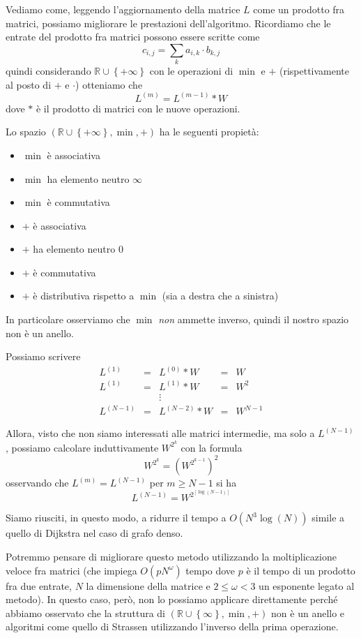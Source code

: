 \documentclass[a4paper,10pt]{amsbook}
\theoremstyle{plain}
\theoremstyle{definition}
\theoremstyle{remark}
\newcommand{\set}[1]{\left\{#1\right\}}
\newcommand{\pa}[1]{\left(#1\right)}
\newcommand{\ceil}[1]{\left\lceil#1\right\rceil}
\begin{document}
Vediamo come, leggendo l'aggiornamento della matrice $L$ come un
prodotto fra matrici, possiamo migliorare le prestazioni
dell'algoritmo. Ricordiamo che le entrate del prodotto fra matrici
possono essere scritte come
\[ c_{i,j} = \sum _k a_{i,k} \cdot b_{k,j} \] quindi considerando
$\mathbb{R}\cup \set{+\infty}$ con le operazioni di $\min$ e $+$
(rispettivamente al posto di $+$ e $\cdot$) otteniamo che
\[ L^{(m)} = L^{(m-1)} * W \]
dove $*$ è il prodotto di matrici con le nuove operazioni.

Lo spazio $\pa{\mathbb{R}\cup \set{+\infty} ,\min,+}$ ha le seguenti
propietà:
\begin{itemize}
\item $\min$ è associativa
\item $\min$ ha elemento neutro $\infty$
\item $\min$ è commutativa
\item $+$ è associativa
\item $+$ ha elemento neutro $0$
\item $+$ è commutativa
\item $+$ è distributiva rispetto a $\min$ (sia a destra che a sinistra)
\end{itemize}
In particolare osserviamo che $\min$ \emph{non} ammette inverso,
quindi il nostro spazio non \`e un anello.


Possiamo scrivere
\begin{align*}
  L^{(1)} & = & L^{(0)} * W & = & W \\
  L^{(1)} & = & L^{(1)} * W & = & W^2 \\
  & & \vdots & & \\
  L^{(N-1)} & = & L^{(N-2)} * W & = & W^{N-1} 
\end{align*}

Allora, visto che non siamo interessati alle matrici intermedie, ma
solo a $L^{(N-1)}$, possiamo calcolare induttivamente $W^{2^k}$ con la
formula
\[ W ^{2^k} = \pa{W ^{2^{k-1}}} ^2 \]
osservando che $L^{(m)} = L^{(N-1)}$ per $m \ge N-1$ si ha
\[ L^{(N-1)} = W^{2 ^{\ceil {\log \pa{ N-1} } } } \]

Siamo riusciti, in questo modo, a ridurre il tempo a $O\pa{ N^3 \log
  (N)}$
simile a quello di Dijkstra nel caso di grafo denso.

Potremmo pensare di migliorare questo metodo utilizzando la
moltiplicazione veloce fra matrici (che impiega $O\pa{pN^\omega}$
tempo dove $p$ è il tempo di un prodotto fra due entrate, $N$ la
dimensione della matrice e $2 \le \omega <3$ un esponente legato al
metodo). In questo caso, però, non lo possiamo applicare direttamente
perché abbiamo osservato che la struttura di $\pa{ \mathbb{R} \cup
  \set{\infty}, \min , +}$ non è un anello e algoritmi come quello di
Strassen utilizzando l'inverso della prima operazione.
\end{document}
